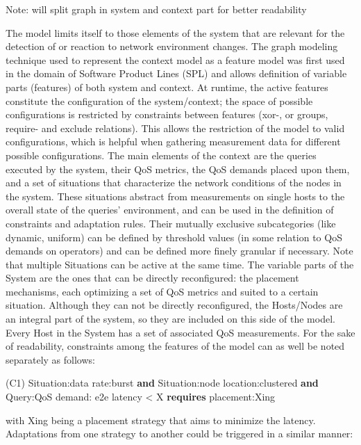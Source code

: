Note: will split graph in system and context part for better readability 


The model limits itself to those elements of the system that are relevant for the detection of or reaction to network environment changes.
The graph modeling technique used to represent the context model as a feature model was first used in the domain of Software Product Lines (SPL) and allows definition of variable parts (features) of both system and context. At runtime, the active features constitute the configuration of the system/context; the space of possible configurations is restricted by constraints between features (xor-, or groups, require- and exclude relations). This allows the restriction of the model to valid configurations, which is helpful when gathering measurement data for different possible configurations. 
The main elements of the context are the queries executed by the system, their QoS metrics, the QoS demands placed upon them, and a set of situations that characterize the network conditions of the nodes in the system. These situations abstract from measurements on single hosts to the overall state of the queries' environment, and can be used in the definition of constraints and adaptation rules. Their mutually exclusive subcategories (like dynamic, uniform) can be defined by threshold values (in some relation to QoS demands on operators) and can be defined more finely granular if necessary. Note that multiple Situations can be active at the same time.
The variable parts of the System are the ones that can be directly reconfigured: the placement mechanisms, each optimizing a set of QoS metrics and suited to a certain situation. Although they can not be directly reconfigured, the Hosts/Nodes are an integral part of the system, so they are included on this side of the model. Every Host in the System has a set of associated QoS measurements.
For the sake of readability, constraints among the features of the model can as well be noted separately as follows: 
\newline
\begin{center}
 (C1) Situation:data rate:burst \textbf{and} Situation:node location:clustered \textbf{and} Query:QoS demand: e2e latency < X \textbf{requires} placement:Xing\\
 
 \end{center} 
with Xing being a placement strategy that aims to minimize the latency.
Adaptations from one strategy to another could be triggered in a similar manner:


